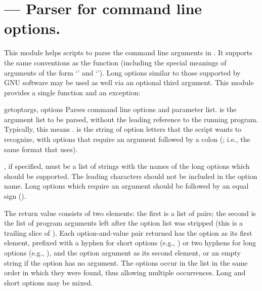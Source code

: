 \section{ ---
         Parser for command line options.}



This module helps scripts to parse the command line arguments in
.
It supports the same conventions as the \UNIX{} 
function (including the special meanings of arguments of the form
`\code{-}' and `\code{-}\code{-}').
Long options similar to those supported by
GNU software may be used as well via an optional third argument.
This module provides a single function and an exception:

\begin{funcdesc}{getopt}{args, options}
Parses command line options and parameter list.   is the
argument list to be parsed, without the leading reference to the
running program. Typically, this means .
 is the string of option letters that the script wants to
recognize, with options that require an argument followed by a colon
(\character{:}; i.e., the same format that \UNIX{}
 uses).

, if specified, must be a list of strings with the
names of the long options which should be supported.  The leading
 characters should not be included in the option
name.  Long options which require an argument should be followed by an
equal sign (\character{=}).

The return value consists of two elements: the first is a list of
 pairs; the second is the list of
program arguments left after the option list was stripped (this is a
trailing slice of ).  Each option-and-value pair returned
has the option as its first element, prefixed with a hyphen for short
options (e.g., ) or two hyphens for long options (e.g.,
), and the option argument as its second
element, or an empty string if the option has no argument.  The
options occur in the list in the same order in which they were found,
thus allowing multiple occurrences.  Long and short options may be
mixed.
\end{funcdesc}

